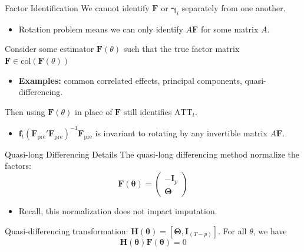 \documentclass[aspectratio=169,t,11pt]{beamer}
\begin{document}
\begin{frame}{Factor Identification}\label{slide:appendix-column_span_condition}
  We cannot identify $\bm F$ or $\bm{\gamma}_i$ separately from one another. 
  \begin{itemize}
    \item Rotation problem means we can only identify $A \bm F$ for some matrix $A$.
  \end{itemize}

  \medskip
  Consider some estimator $\bm{F}(\theta)$ such that the true factor matrix $\bm{F} \in \text{col}(\bm{F}(\theta))$
  \begin{itemize}
    \item \textbf{Examples:} common correlated effects, principal components, quasi-differencing.
  \end{itemize}

  \smallskip
  Then using $\bm{F}(\theta)$ in place of $\bm{F}$ still identifies $\text{ATT}_t$.
  \begin{itemize}
    \item $\bm{f}_t (\bm{F}_{\text{pre}}' \bm{F}_{\text{pre}})^{-1} \bm{F}_{\text{pre}}$ is invariant to rotating by any invertible matrix $A \bm{F}$.
  \end{itemize}

\end{frame}


\begin{frame}{Quasi-long Differencing Details}\label{slide:appendix-qld_details}
  The quasi-long differencing method \citet{Ahn_Lee_Schmidt_2013} normalize the factors:
  \begin{equation*}
    \bm{F}(\bm{\theta}) = 
    \begin{pmatrix}
        -\bm I_p \\
        \bm \Theta
    \end{pmatrix}
  \end{equation*}

  \begin{itemize}
    \item Recall, this normalization does not impact imputation.
  \end{itemize}

  Quasi-differencing transformation: $\bm H(\bm \theta) = [\bm \Theta, \bm I_{(T-p)}]$. For all $\theta$, we have
  $$
    \bm{H}(\bm{\theta}) \bm{F}(\bm{\theta}) = 0
  $$

\end{frame}
\end{document}
